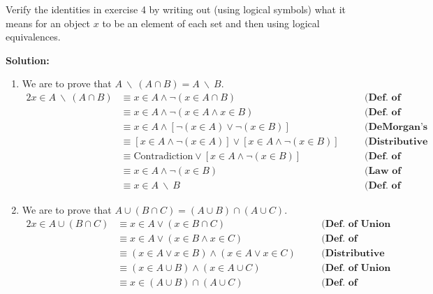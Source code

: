 Verify the identities in exercise 4 by writing out (using logical symbols) what it means for an object $x$ to be an element of each set and then using logical equivalences.

\textbf{Solution:}
\begin{enumerate}[label=(\alph*)]
    \item We are to prove that $A \: \backslash \: (A \cap B) = A \: \backslash \: B$.
    \begin{alignat*}{2}
        x \in A \: \backslash \: (A \cap B) &\equiv x \in A \wedge \neg (x \in A \cap B) && \quad \textbf{(Def. of Difference of Sets)} \\
        &\equiv x \in A \wedge \neg (x \in A \wedge x \in B) && \quad \textbf{(Def. of Intersection of Sets)} \\
        &\equiv x \in A \wedge [\neg (x \in A) \vee \neg (x \in B)] && \quad \textbf{(DeMorgan's Law)}\\
        &\equiv [x \in A \wedge \neg (x \in A)] \vee [x \in A \wedge \neg (x \in B)] && \quad \textbf{(Distributive Law)}\\
        &\equiv \text{Contradiction} \vee [x \in A \wedge \neg (x \in B)] && \quad \textbf{(Def. of Contradiction)}\\
        &\equiv x \in A \wedge \neg (x \in B) && \quad \textbf{(Law of Contradiction)}\\
        &\equiv x \in A \: \backslash \: B && \quad \textbf{(Def. of Difference of Sets)}
    \end{alignat*}
    \item We are to prove that $A \cup (B \cap C) = (A \cup B) \cap (A \cup C)$.
    \begin{alignat*}{2}
        x \in A \cup (B \cap C) &\equiv x \in A \vee (x \in B \cap C) && \quad \textbf{(Def. of Union of Sets)} \\
        &\equiv x \in A \vee (x \in B \wedge x \in C) && \quad \textbf{(Def. of Intersection of Sets)} \\
        &\equiv (x \in A \vee x \in B) \wedge (x \in A \vee x \in C) && \quad \textbf{(Distributive Law)}\\
        &\equiv (x \in A \cup B) \wedge (x \in A \cup C) && \quad \textbf{(Def. of Union of Sets)}\\
        &\equiv x \in (A \cup B) \cap (A \cup C) && \quad \textbf{(Def. of Intersection of Sets)}
    \end{alignat*}
\end{enumerate}
\pagebreak